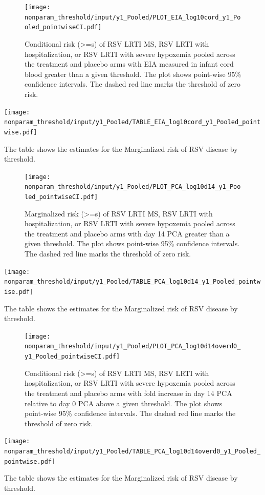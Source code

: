 \documentclass[11pt]{article}
\begin{document}
\begin{figure}[H]
\centering
\texttt{[image: nonparam\_threshold/input/y1\_Pooled/PLOT\_EIA\_log10cord\_y1\_Pooled\_pointwiseCI.pdf]}
\caption{Conditional risk (>=s) of RSV LRTI MS, RSV LRTI with hospitalization, or RSV LRTI with severe hypoxemia pooled across the treatment and placebo arms with EIA measured in infant cord blood greater than a given threshold. The plot shows point-wise 95\% confidence intervals. The dashed red line marks the threshold of zero risk.}
\end{figure}

\begin{table}[H]
\centering
\texttt{[image: nonparam\_threshold/input/y1\_Pooled/TABLE\_EIA\_log10cord\_y1\_Pooled\_pointwise.pdf]}
\caption{The table shows the  estimates for the Marginalized risk of RSV disease by threshold. }
\end{table}

\begin{figure}[H]
\centering
\texttt{[image: nonparam\_threshold/input/y1\_Pooled/PLOT\_PCA\_log10d14\_y1\_Pooled\_pointwiseCI.pdf]}
\caption{Marginalized risk (>=s) of RSV LRTI MS, RSV LRTI with hospitalization, or RSV LRTI with severe hypoxemia pooled across the treatment and placebo arms with day 14 PCA greater than a given threshold. The plot shows point-wise 95\% confidence intervals. The dashed red line marks the threshold of zero risk.}
\end{figure}

\begin{table}[H]
\centering
\texttt{[image: nonparam\_threshold/input/y1\_Pooled/TABLE\_PCA\_log10d14\_y1\_Pooled\_pointwise.pdf]}
\caption{The table shows the  estimates for the Marginalized risk of RSV disease by threshold. }
\end{table}

\begin{figure}[H]
\centering
\texttt{[image: nonparam\_threshold/input/y1\_Pooled/PLOT\_PCA\_log10d14overd0\_y1\_Pooled\_pointwiseCI.pdf]}
\caption{Conditional risk (>=s) of RSV LRTI MS, RSV LRTI with hospitalization, or RSV LRTI with severe hypoxemia pooled across the treatment and placebo arms with fold increase in day 14 PCA relative to day 0 PCA above a given threshold. The plot shows point-wise 95\% confidence intervals. The dashed red line marks the threshold of zero risk.}
\end{figure}

\begin{table}[H]
\centering
\texttt{[image: nonparam\_threshold/input/y1\_Pooled/TABLE\_PCA\_log10d14overd0\_y1\_Pooled\_pointwise.pdf]}
\caption{The table shows the  estimates for the Marginalized risk of RSV disease by threshold. }
\end{table}
\end{document}
